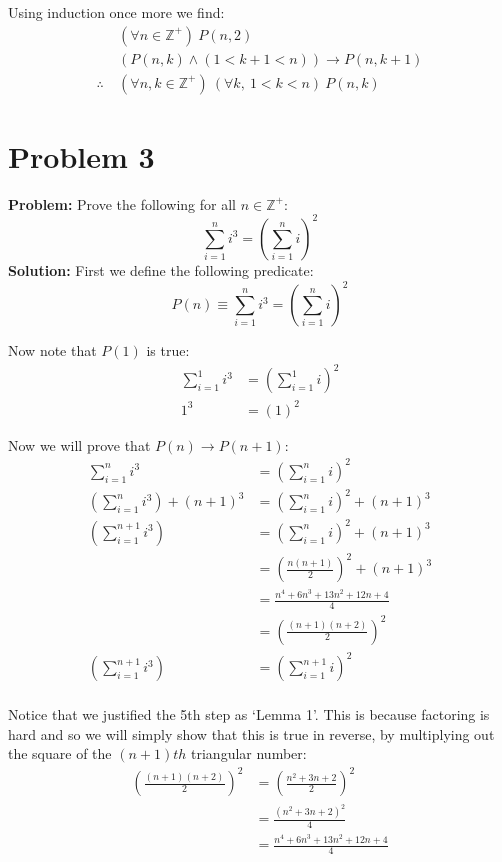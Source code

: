 \documentclass{article}
\begin{document}
Using induction once more we find:
\begin{align*}
&(\forall n\in \mathbb{Z}^+)\ P(n,2)\\
&(P(n,k)\wedge(1<k+1<n))\rightarrow P(n,k+1)\\
\therefore\ &{(\forall n,k\in \mathbb{Z}^+)\ (\forall k,\ 1<k<n)\ P(n,k)}
\end{align*}

\section*{Problem 3}
\textbf{Problem:} Prove the following for all $n\in\mathbb Z^+$:
$$\sum_{i=1}^ni^3=\left(\sum_{i=1}^ni\right)^2$$
\textbf{Solution:} First we define the following predicate:
$$P(n)\equiv \sum_{i=1}^ni^3=\left(\sum_{i=1}^ni\right)^2$$

Now note that $P(1)$ is true:
\begin{align*}
  \sum_{i=1}^1i^3&=\left(\sum_{i=1}^1i\right)^2\tag*{$P(1)$}\\
  1^3&=(1)^2\tag{def. of $1$-ary sum}
\end{align*}

Now we will prove that $P(n)\rightarrow P(n+1)$:
\begin{align*}
  \sum_{i=1}^ni^3&=\left(\sum_{i=1}^ni\right)^2\tag{$P(n)$ given}\\
  \left(\sum_{i=1}^ni^3\right)+(n+1)^3&=\left(\sum_{i=1}^ni\right)^2+(n+1)^3\\
  \left(\sum_{i=1}^{n+1}i^3\right)&=\left(\sum_{i=1}^ni\right)^2+(n+1)^3\tag{def. of finitary sum}\\
  &=\left(\frac{n(n+1)}{2}\right)^2+(n+1)^3\tag{$n$th triangular number}\\
  &=\frac{n^4+6n^3+13n^2+12n+4}{4}\tag{algebra}\\
  &=\left(\frac{(n+1)(n+2)}{2}\right)^2\tag{Lemma 1}\\
  \left(\sum_{i=1}^{n+1}i^3\right)&=\left(\sum_{i=1}^{n+1}i\right)^2\tag{$(n+1)$th triangular number}\\
\end{align*}

Notice that we justified the 5th step as `Lemma 1'. This is because factoring is hard and so we will simply show that this is true in reverse, by multiplying out the square of the $(n+1)th$ triangular number:
\begin{align*}
  \left(\frac{(n+1)(n+2)}{2}\right)^2&=\left(\frac{n^2+3n+2}{2}\right)^2\\
  &=\frac{(n^2+3n+2)^2}{4}\\
  &=\frac{n^4+6n^3+13n^2+12n+4}{4}
\end{align*}
\end{document}
